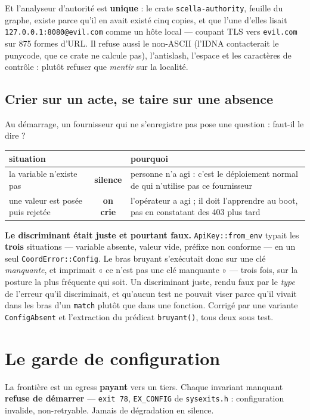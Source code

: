 \documentclass[10pt]{report}
\newcommand{\code}[1]{\texttt{\small #1}}
\newcommand{\att}[1]{\textcolor{amber}{\textbf{#1}}}
\begin{document}
Et l'analyseur d'autorité est \textbf{unique} : le crate \code{scella-authority}, feuille du graphe,
existe parce qu'il en avait existé cinq copies, et que l'une d'elles lisait
\code{127.0.0.1:8080@evil.com} comme un hôte local --- coupant TLS vers \code{evil.com} sur
875 formes d'URL. Il refuse aussi le non-ASCII (l'IDNA contacterait le punycode, que ce crate ne
calcule pas), l'antislash, l'espace et les caractères de contrôle : plutôt refuser que \emph{mentir}
sur la localité.

\subsection{Crier sur un acte, se taire sur une absence}

Au démarrage, un fournisseur qui ne s'enregistre pas pose une question : faut-il le dire ?

\begin{longtable}{@{}p{5.4cm} c p{7.8cm}@{}}
\toprule \textbf{situation} & & \textbf{pourquoi} \\ \midrule \endhead
la variable n'existe pas & \textbf{silence} & personne n'a agi : c'est le déploiement normal de qui n'utilise pas ce fournisseur \\
une valeur est posée puis rejetée & \textbf{on crie} & l'opérateur a agi ; il doit l'apprendre au boot, pas en constatant des 403 plus tard \\
\bottomrule
\end{longtable}

\att{Le discriminant était juste et pourtant faux.} \code{ApiKey::from\_env} typait les
\textbf{trois} situations --- variable absente, valeur vide, préfixe non conforme --- en un seul
\code{CoordError::Config}. Le bras bruyant s'exécutait donc sur une clé \emph{manquante}, et
imprimait « ce n'est pas une clé manquante » --- trois fois, sur la posture la plus fréquente qui
soit. Un discriminant juste, rendu faux par le \emph{type} de l'erreur qu'il discriminait, et
qu'aucun test ne pouvait viser parce qu'il vivait dans les bras d'un \code{match} plutôt que dans
une fonction. Corrigé par une variante \code{ConfigAbsent} et l'extraction du prédicat
\code{bruyant()}, tous deux sous test.

\section{Le garde de configuration}

La frontière est un egress \textbf{payant} vers un tiers. Chaque invariant manquant \textbf{refuse
de démarrer} --- \code{exit 78}, \code{EX\_CONFIG} de \code{sysexits.h} : configuration invalide,
non-retryable. Jamais de dégradation en silence.
\end{document}
